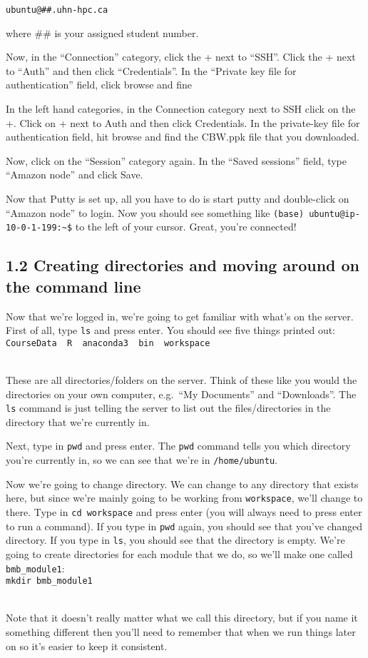 \documentclass[
]{book}
\begin{document}
\begin{verbatim}
ubuntu@##.uhn-hpc.ca
\end{verbatim}

where \#\# is your assigned student number.

Now, in the ``Connection'' category, click the + next to ``SSH''. Click the + next to ``Auth'' and then click ``Credentials''. In the ``Private key file for authentication'' field, click browse and fine

In the left hand categories, in the Connection category next to SSH click on the +. Click on + next to Auth and then click Credentials. In the private-key file for authentication field, hit browse and find the CBW.ppk file that you downloaded.

Now, click on the ``Session'' category again. In the ``Saved sessions'' field, type ``Amazon node'' and click Save.

Now that Putty is set up, all you have to do is start putty and double-click on ``Amazon node'' to login. Now you should see something like \texttt{(base)\ ubuntu@ip-10-0-1-199:\textasciitilde{}\$} to the left of your cursor. Great, you're connected!

\subsection{1.2 Creating directories and moving around on the command line}\label{creating-directories-and-moving-around-on-the-command-line}

Now that we're logged in, we're going to get familiar with what's on the server. First of all, type \texttt{ls} and press enter. You should see five things printed out:\\
\texttt{CourseData\ \ R\ \ anaconda3\ \ bin\ \ workspace}\strut \\

These are all directories/folders on the server. Think of these like you would the directories on your own computer, e.g.~``My Documents'' and ``Downloads''. The \texttt{ls} command is just telling the server to list out the files/directories in the directory that we're currently in.

Next, type in \texttt{pwd} and press enter. The \texttt{pwd} command tells you which directory you're currently in, so we can see that we're in \texttt{/home/ubuntu}.

Now we're going to change directory. We can change to any directory that exists here, but since we're mainly going to be working from \texttt{workspace}, we'll change to there. Type in \texttt{cd\ workspace} and press enter (you will always need to press enter to run a command). If you type in \texttt{pwd} again, you should see that you've changed directory. If you type in \texttt{ls}, you should see that the directory is empty. We're going to create directories for each module that we do, so we'll make one called \texttt{bmb\_module1}:\\
\texttt{mkdir\ bmb\_module1}\strut \\
Note that it doesn't really matter what we call this directory, but if you name it something different then you'll need to remember that when we run things later on so it's easier to keep it consistent.
\end{document}
